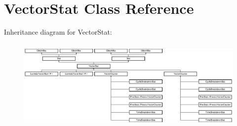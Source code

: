 \hypertarget{classVectorStat}{\section{Vector\-Stat Class Reference}
\label{classVectorStat}
}
Inheritance diagram for Vector\-Stat\-:\begin{figure}[H]
\begin{center}
\leavevmode
\includegraphics[height=4.465710cm]{classVectorStat}
\end{center}
\end{figure}
